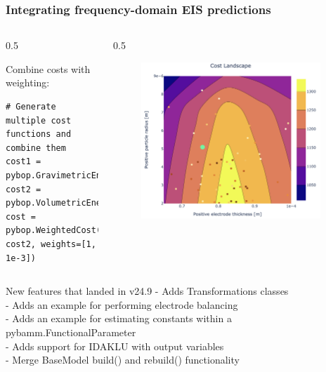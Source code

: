 \documentclass[aspectratio=169]{beamer}
\begin{document}
\begin{frame}[fragile,t]
\frametitle{Integrating frequency-domain EIS predictions}
\vspace{-2em}
\begin{columns}
\begin{column}{0.5\textwidth}
\vspace{2em}
\begin{block}{Combine costs with weighting:}
\begin{lstlisting}[firstnumber=1, xleftmargin=10pt]
# Generate multiple cost functions and combine them
cost1 = pybop.GravimetricEnergyDensity(problem)
cost2 = pybop.VolumetricEnergyDensity(problem)
cost = pybop.WeightedCost(cost1, cost2, weights=[1, 1e-3])
\end{lstlisting}
\end{block}
\vspace{3.5em}
\end{column}
\begin{column}{0.5\textwidth}
    \begin{figure}
    \includegraphics[width=0.94\textwidth]{Images/Highlights/weighted-design-landscape.png}
    \end{figure}
\end{column}
\end{columns}
\end{frame}


\begin{frame}[fragile,t]{New features that landed in v24.9}
    \vspace{-1em}
     - Adds Transformations classes\\[1em]
     - Adds an example for performing electrode balancing\\[1em]
     - Adds an example for estimating constants within a pybamm.FunctionalParameter\\[1em]
     - Adds support for IDAKLU with output variables\\[1em]
     - Merge BaseModel build() and rebuild() functionality
\end{frame}
\end{document}
